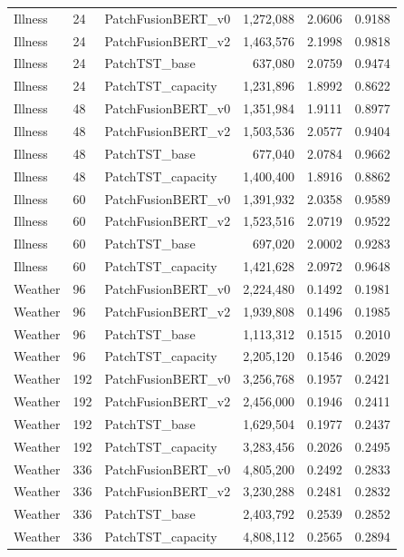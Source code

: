 \begin{tabular}{lllrcc}
Illness & 24 & PatchFusionBERT_v0 & 1,272,088 & 2.0606 & 0.9188 \\
Illness & 24 & PatchFusionBERT_v2 & 1,463,576 & 2.1998 & 0.9818 \\
Illness & 24 & PatchTST_base & 637,080 & 2.0759 & 0.9474 \\
Illness & 24 & PatchTST_capacity & 1,231,896 & 1.8992 & 0.8622 \\
Illness & 48 & PatchFusionBERT_v0 & 1,351,984 & 1.9111 & 0.8977 \\
Illness & 48 & PatchFusionBERT_v2 & 1,503,536 & 2.0577 & 0.9404 \\
Illness & 48 & PatchTST_base & 677,040 & 2.0784 & 0.9662 \\
Illness & 48 & PatchTST_capacity & 1,400,400 & 1.8916 & 0.8862 \\
Illness & 60 & PatchFusionBERT_v0 & 1,391,932 & 2.0358 & 0.9589 \\
Illness & 60 & PatchFusionBERT_v2 & 1,523,516 & 2.0719 & 0.9522 \\
Illness & 60 & PatchTST_base & 697,020 & 2.0002 & 0.9283 \\
Illness & 60 & PatchTST_capacity & 1,421,628 & 2.0972 & 0.9648 \\
Weather & 96 & PatchFusionBERT_v0 & 2,224,480 & 0.1492 & 0.1981 \\
Weather & 96 & PatchFusionBERT_v2 & 1,939,808 & 0.1496 & 0.1985 \\
Weather & 96 & PatchTST_base & 1,113,312 & 0.1515 & 0.2010 \\
Weather & 96 & PatchTST_capacity & 2,205,120 & 0.1546 & 0.2029 \\
Weather & 192 & PatchFusionBERT_v0 & 3,256,768 & 0.1957 & 0.2421 \\
Weather & 192 & PatchFusionBERT_v2 & 2,456,000 & 0.1946 & 0.2411 \\
Weather & 192 & PatchTST_base & 1,629,504 & 0.1977 & 0.2437 \\
Weather & 192 & PatchTST_capacity & 3,283,456 & 0.2026 & 0.2495 \\
Weather & 336 & PatchFusionBERT_v0 & 4,805,200 & 0.2492 & 0.2833 \\
Weather & 336 & PatchFusionBERT_v2 & 3,230,288 & 0.2481 & 0.2832 \\
Weather & 336 & PatchTST_base & 2,403,792 & 0.2539 & 0.2852 \\
Weather & 336 & PatchTST_capacity & 4,808,112 & 0.2565 & 0.2894 \\
\bottomrule
\end{tabular}
